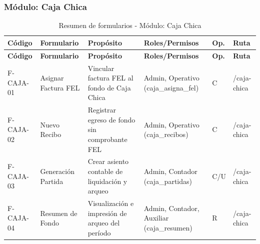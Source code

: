 \subsubsection{Módulo: Caja Chica}

{
\small
{}
\setlength{\parindent}{0pt}
\begin{xltabular}{\linewidth}{
    >{\raggedright\arraybackslash}p{1.8cm} 
    >{\raggedright\arraybackslash}p{2.8cm} 
    >{\raggedright\arraybackslash}X 
    >{\raggedright\arraybackslash}p{2.5cm} 
    >{\centering\arraybackslash}p{0.8cm} 
    >{\raggedright\arraybackslash}p{2.0cm}
}

    \caption{Resumen de formularios - Módulo: Caja Chica} \label{tab:cap4_cajachica_resumen} \\
    \toprule
    \textbf{Código} & \textbf{Formulario} & \textbf{Propósito} & \textbf{Roles/Permisos} & \textbf{Op.} & \textbf{Ruta} \\
    \midrule
    \endfirsthead

    \toprule
    \textbf{Código} & \textbf{Formulario} & \textbf{Propósito} & \textbf{Roles/Permisos} & \textbf{Op.} & \textbf{Ruta} \\
    \midrule
    \endhead

    \endfoot

\bottomrule
\endlastfoot

    F-CAJA-01 & Asignar Factura FEL & Vincular factura FEL al fondo de Caja Chica & Admin, Operativo (\textrm{caja\_asigna\_fel}) & C & \textrm{/caja-chica} \\
    \addlinespace
    F-CAJA-02 & Nuevo Recibo & Registrar egreso de fondo sin comprobante FEL & Admin, Operativo (\textrm{caja\_recibos}) & C & \textrm{/caja-chica} \\
    \addlinespace
    F-CAJA-03 & Generación Partida & Crear asiento contable de liquidación y arqueo & Admin, Contador (\textrm{caja\_partidas}) & C/U & \textrm{/caja-chica} \\
    \addlinespace
    F-CAJA-04 & Resumen de Fondo & Visualización e impresión de arqueo del período & Admin, Contador, Auxiliar (\textrm{caja\_resumen}) & R & \textrm{/caja-chica} \\
\end{xltabular}
}

